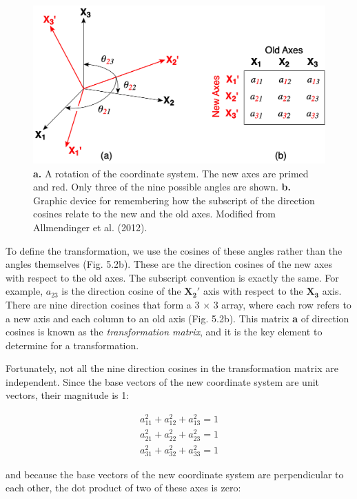 \documentclass[a4paper , 12pt]{book}
\begin{document}
 \begin{figure}[H]
    \centering
    \includegraphics[width=12cm]{Figures/ch5f2.png}
    \caption{\textbf{a.} A rotation of the coordinate system. The new axes are primed and red. Only three of the nine possible angles are shown. \textbf{b.} Graphic device for remembering how the subscript of the direction cosines relate to the new and the old axes. Modified from Allmendinger et al. (2012).}
\end{figure}

To define the transformation, we use the cosines of these angles rather than the angles themselves (Fig. 5.2b). These are the direction cosines of the new axes with respect to the old axes. The subscript convention is exactly the same. For example, $a_{23}$ is the direction cosine of the $\mathbf{X_2\text{$'$}}$ axis with respect to the $\mathbf{X_3}$ axis. There are nine direction cosines that form a 3 $\times$ 3 array, where each row refers to a new axis and each column to an old axis (Fig. 5.2b). This matrix \textbf{a} of direction cosines is known as the \textit{transformation matrix}, and it is the key element to determine for a transformation.

Fortunately, not all the nine direction cosines in the transformation matrix are independent. Since the base vectors of the new coordinate system are unit vectors, their magnitude is 1:

\begin{equation}
    \begin{split}
        a_{11}^2+a_{12}^2+a_{13}^2=1 \\
        a_{21}^2+a_{22}^2+a_{23}^2=1 \\
        a_{31}^2+a_{32}^2+a_{33}^2=1
    \end{split}
\end{equation}

and because the base vectors of the new coordinate system are perpendicular to each other, the dot product of two of these axes is zero:
\end{document}
